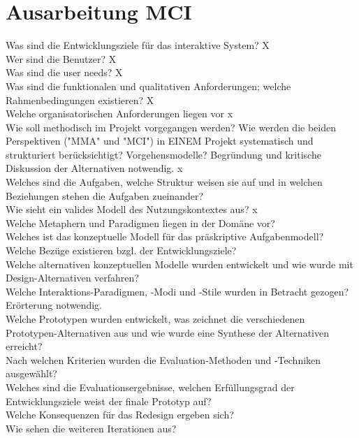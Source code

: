 
\section{Ausarbeitung MCI}

Was sind die Entwicklungsziele für das interaktive System? X\\
Wer sind die Benutzer? X\\
Was sind die user needs? X\\
Was sind die funktionalen und qualitativen Anforderungen; welche Rahmenbedingungen existieren? X\\
Welche organisatorischen Anforderungen liegen vor x\\
Wie soll methodisch im Projekt vorgegangen werden? Wie werden die beiden Perspektiven ("MMA" und "MCI") in EINEM Projekt systematisch und strukturiert berücksichtigt? Vorgehensmodelle? Begründung und kritische Diskussion der Alternativen notwendig. x\\
Welches sind die Aufgaben, welche Struktur weisen sie auf und in welchen Beziehungen stehen die Aufgaben zueinander?\\
Wie sieht ein valides Modell des Nutzungskontextes aus? x\\
Welche Metaphern und Paradigmen liegen in der Domäne vor?\\
Welches ist das konzeptuelle Modell für das präskriptive Aufgabenmodell? \\
Welche Bezüge existieren bzgl. der Entwicklungsziele?\\
Welche alternativen konzeptuellen Modelle wurden entwickelt und wie wurde mit Design-Alternativen verfahren?\\
Welche Interaktions-Paradigmen, -Modi und -Stile wurden in Betracht gezogen? Erörterung notwendig.\\
Welche Prototypen wurden entwickelt, was zeichnet die verschiedenen Prototypen-Alternativen aus und wie wurde eine Synthese der Alternativen erreicht?\\
Nach welchen Kriterien wurden die Evaluation-Methoden und -Techniken ausgewählt?\\
Welches sind die Evaluationsergebnisse, welchen Erfüllungsgrad der Entwicklungsziele weist der finale Prototyp auf?\\
Welche Konsequenzen für das Redesign ergeben sich?\\
Wie sehen die weiteren Iterationen aus?\\

\newpage



\newpage



\newpage



\newpage



